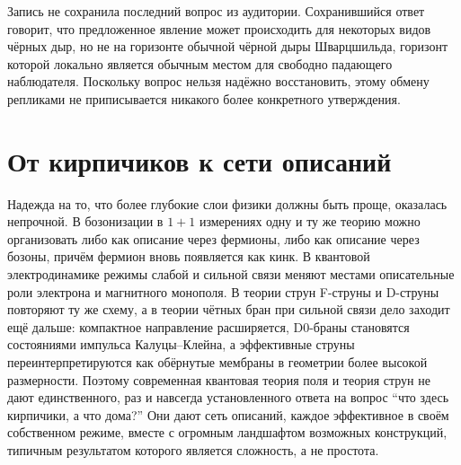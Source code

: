 
Запись не сохранила последний вопрос из аудитории. Сохранившийся ответ говорит, что предложенное явление может происходить для некоторых видов чёрных дыр, но не на горизонте обычной чёрной дыры Шварцшильда, горизонт которой локально является обычным местом для свободно падающего наблюдателя. Поскольку вопрос нельзя надёжно восстановить, этому обмену репликами не приписывается никакого более конкретного утверждения.

\section{От кирпичиков к сети описаний}

Надежда на то, что более глубокие слои физики должны быть проще, оказалась непрочной. В бозонизации в \(1+1\) измерениях одну и ту же теорию можно организовать либо как описание через фермионы, либо как описание через бозоны, причём фермион вновь появляется как кинк. В квантовой электродинамике режимы слабой и сильной связи меняют местами описательные роли электрона и магнитного монополя. В теории струн F-струны и D-струны повторяют ту же схему, а в теории чётных бран при сильной связи дело заходит ещё дальше: компактное направление расширяется, D0-браны становятся состояниями импульса Калуцы--Клейна, а эффективные струны переинтерпретируются как обёрнутые мембраны в геометрии более высокой размерности. Поэтому современная квантовая теория поля и теория струн не дают единственного, раз и навсегда установленного ответа на вопрос ``что здесь кирпичики, а что дома?'' Они дают сеть описаний, каждое эффективное в своём собственном режиме, вместе с огромным ландшафтом возможных конструкций, типичным результатом которого является сложность, а не простота.
